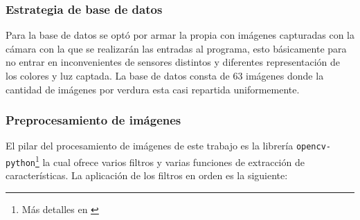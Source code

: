 \documentclass[12pt,a4paper]{article}
\begin{document}
\subsubsection*{Estrategia de base de datos}
Para la base de datos se optó por armar la propia con imágenes capturadas con la cámara con la que se realizarán las entradas al programa, esto básicamente para no entrar en inconvenientes de sensores distintos y diferentes representación de los colores y luz captada. La base de datos consta de 63 imágenes donde la cantidad de imágenes por verdura esta casi repartida uniformemente. 

\subsubsection*{Preprocesamiento de imágenes}
El pilar del procesamiento de imágenes de este trabajo es la librería \texttt{opencv-python}\footnote{Más detalles en \cite{opencv_library}} la cual ofrece varios filtros y varias funciones de extracción de características. La aplicación de los filtros en orden es la siguiente:
\end{document}
